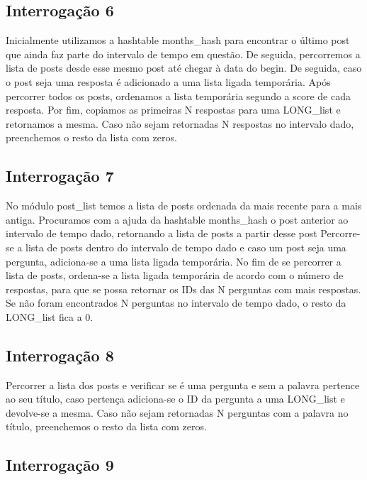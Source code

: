 \documentclass[10pt]{article}
\begin{document}
\subsection{Interrogação 6}

	Inicialmente utilizamos a hashtable months\_hash para encontrar o último post que ainda faz parte do intervalo de tempo em questão. De seguida, percorremos a lista de posts desde esse mesmo post até chegar à data do begin. De seguida, caso o post seja uma resposta é adicionado a uma lista ligada temporária. Após percorrer todos os posts, ordenamos a lista temporária segundo a score de cada resposta. Por fim, copiamos as primeiras N respostas para uma LONG\_list e retornamos a mesma. Caso não sejam retornadas N respostas no intervalo dado, preenchemos o resto da lista com zeros.

\subsection{Interrogação 7}

	No módulo post\_list temos a lista de posts ordenada da mais recente para a mais antiga.
	Procuramos com a ajuda da hashtable months\_hash o post anterior ao intervalo de tempo dado, retornando a lista de posts a partir desse post
	Percorre-se a lista de posts dentro do intervalo de tempo dado e caso um post seja uma pergunta, adiciona-se a uma lista ligada temporária.	
	No fim de se percorrer a lista de posts, ordena-se a lista ligada temporária de acordo com o número de respostas, para que se possa retornar os IDs das N perguntas com mais respostas.
	Se não foram encontrados N perguntas no intervalo de tempo dado, o resto da LONG\_list fica a 0.

\subsection{Interrogação 8}

	Percorrer a lista dos posts e verificar se é uma pergunta e sem a palavra pertence ao seu título, caso pertença adiciona-se o ID da pergunta a uma LONG\_list e devolve-se a mesma. Caso não sejam retornadas N perguntas com a palavra no título, preenchemos o resto da lista com zeros.

\subsection{Interrogação 9}
\end{document}
